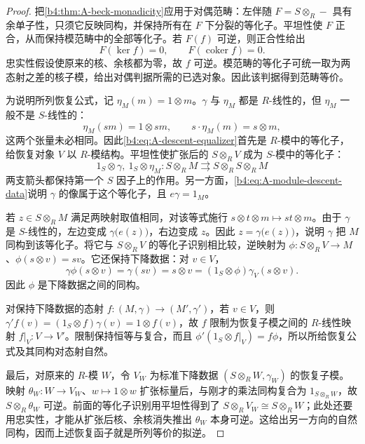\begin{proof}
	把\cref{b4:thm:A-beck-monadicity}应用于对偶范畴：左伴随 \(F=S\otimes_R-\) 具有余单子性，只须它反映同构，并保持所有在 \(F\) 下分裂的等化子。平坦性使 \(F\) 正合，从而保持模范畴中的全部等化子。若 \(F(f)\) 可逆，则正合性给出
	\[
		F(\ker f)=0,\qquad F(\operatorname{coker}f)=0.
	\]
	忠实性假设使原来的核、余核都为零，故 \(f\) 可逆。模范畴的等化子可统一取为两态射之差的核子模，给出对偶判据所需的已选对象。因此该判据得到范畴等价。

	为说明所列恢复公式，记 \(\eta_M(m)=1\otimes m\)。\(\gamma\) 与 \(\eta_M\) 都是 \(R\)-线性的，但 \(\eta_M\) 一般不是 \(S\)-线性的：
	\[
		\eta_M(sm)=1\otimes sm,\qquad s\cdot\eta_M(m)=s\otimes m,
	\]
	这两个张量未必相同。因此\eqref{b4:eq:A-descent-equalizer}首先是 \(R\)-模中的等化子，给恢复对象 \(V\) 以 \(R\)-模结构。平坦性使扩张后的 \(S\otimes_RV\) 成为 \(S\)-模中的等化子：
	\[
		1_S\otimes\gamma,\ 1_S\otimes\eta_M: S\otimes_RM\rightrightarrows S\otimes_RS\otimes_RM
	\]
	两支箭头都保持第一个 \(S\) 因子上的作用。另一方面，\eqref{b4:eq:A-module-descent-data}说明 \(\gamma\) 的像属于这个等化子，且 \(e\gamma=1_M\)。

	若 \(z\in S\otimes_RM\) 满足两映射取值相同，对该等式施行 \(s\otimes t\otimes m\mapsto st\otimes m\)。由于 \(\gamma\) 是 \(S\)-线性的，左边变成 \(\gamma\bigl(e(z)\bigr)\)，右边变成 \(z\)。因此 \(z=\gamma\bigl(e(z)\bigr)\)，说明 \(\gamma\) 把 \(M\) 同构到该等化子。将它与 \(S\otimes_RV\) 的等化子识别相比较，逆映射为 \(\phi:S\otimes_RV\to M\)、\(\phi(s\otimes v)=sv\)。它还保持下降数据：对 \(v\in V\)，
	\[
		\gamma\phi(s\otimes v)=\gamma(sv)=s\otimes v =(1_S\otimes\phi)\gamma_V(s\otimes v).
	\]
	因此 \(\phi\) 是下降数据之间的同构。

	对保持下降数据的态射 \(f:(M,\gamma)\to(M',\gamma')\)，若 \(v\in V\)，则 \(\gamma'f(v)=(1_S\otimes f)\gamma(v)=1\otimes f(v)\)，故 \(f\) 限制为恢复子模之间的 \(R\)-线性映射 \(f|_V:V\to V'\)。限制保持恒等与复合，而且 \(\phi'(1_S\otimes f|_V)=f\phi\)，所以所给恢复公式及其同构对态射自然。

	最后，对原来的 \(R\)-模 \(W\)，令 \(V_W\) 为标准下降数据 \((S\otimes_RW,\gamma_W)\) 的恢复子模。映射 \(\theta_W:W\rightarrow V_W\)、\(w\mapsto1\otimes w\) 扩张标量后，与刚才的乘法同构复合为 \(1_{S\otimes_RW}\)，故 \(S\otimes_R\theta_W\) 可逆。前面的等化子识别用平坦性得到了 \(S\otimes_RV_W\cong S\otimes_RW\)；此处还要用忠实性，才能从扩张后核、余核消失推出 \(\theta_W\) 本身可逆。这给出另一方向的自然同构，因而上述恢复函子就是所列等价的拟逆。
\end{proof}

